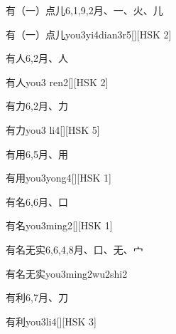 \begin{entry}{有（一）点儿}{6,1,9,2}{⽉、⼀、⽕、⼉}
  \begin{phonetics}{有（一）点儿}{you3yi4dian3r5}[][HSK 2]
  \end{phonetics}
\end{entry}

\begin{entry}{有人}{6,2}{⽉、⼈}
  \begin{phonetics}{有人}{you3 ren2}[][HSK 2]
  \end{phonetics}
\end{entry}

\begin{entry}{有力}{6,2}{⽉、⼒}
  \begin{phonetics}{有力}{you3 li4}[][HSK 5]
  \end{phonetics}
\end{entry}

\begin{entry}{有用}{6,5}{⽉、⽤}
  \begin{phonetics}{有用}{you3yong4}[][HSK 1]
  \end{phonetics}
\end{entry}

\begin{entry}{有名}{6,6}{⽉、⼝}
  \begin{phonetics}{有名}{you3ming2}[][HSK 1]
  \end{phonetics}
\end{entry}

\begin{entry}{有名无实}{6,6,4,8}{⽉、⼝、⽆、⼧}
  \begin{phonetics}{有名无实}{you3ming2wu2shi2}
  \end{phonetics}
\end{entry}

\begin{entry}{有利}{6,7}{⽉、⼑}
  \begin{phonetics}{有利}{you3li4}[][HSK 3]
  \end{phonetics}
\end{entry}

